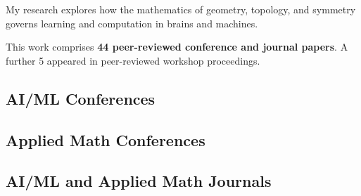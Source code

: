 

My research explores how the mathematics of geometry, topology, and symmetry governs learning and computation in brains and machines. 

This work comprises \textbf{44 peer-reviewed conference and journal papers}. A further 5 appeared in peer-reviewed workshop proceedings.



\newpage
{}


\subsection*{AI/ML Conferences}

\renewcommand*{\bibfont}{\small} %
\begin{refsection}
  \nocite{*}
  {%
    \setlength\bibitemsep{0pt} %
    \printbibliography[heading=none]
  }%
\end{refsection}


\subsection*{Applied Math Conferences}

\renewcommand*{\bibfont}{\small} %
\begin{refsection}
  \nocite{*}
  {%
    \setlength\bibitemsep{0pt} %
    \printbibliography[heading=none]
  }%
\end{refsection}


\subsection*{AI/ML and Applied Math Journals}

